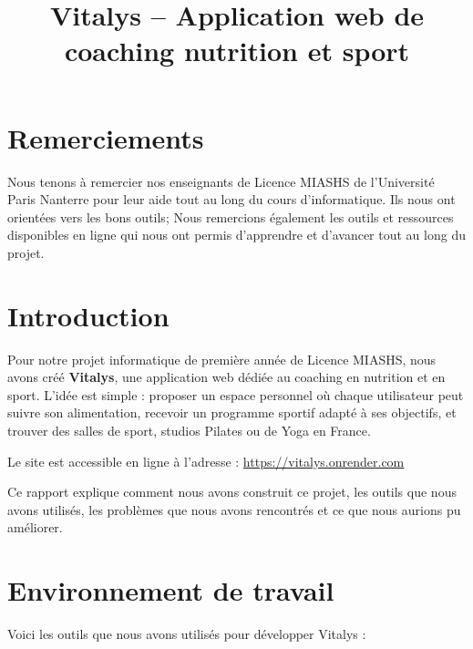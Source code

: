 \documentclass[a4paper, 12pt, twoside]{article}
\title{Vitalys -- Application web de coaching nutrition et sport}
\begin{document}
\pagedegarde



\newpage

\section*{Remerciements}
Nous tenons à remercier nos enseignants de Licence MIASHS de l'Université Paris Nanterre pour leur aide tout au long du cours d'informatique. Ils nous ont orientées vers les bons outils; Nous remercions également les outils et ressources disponibles en ligne qui nous ont permis d'apprendre et d'avancer tout au long du projet.
\newpage

\tableofcontents
\newpage

\section{Introduction}

Pour notre projet informatique de première année de Licence MIASHS, nous avons créé \textbf{Vitalys}, une application web dédiée au coaching en nutrition et en sport. L'idée est simple : proposer un espace personnel où chaque utilisateur peut suivre son alimentation, recevoir un programme sportif adapté à ses objectifs, et trouver des salles de sport, studios Pilates ou de Yoga en France.

Le site est accessible en ligne à l'adresse : \url{https://vitalys.onrender.com}

Ce rapport explique comment nous avons construit ce projet, les outils que nous avons utilisés, les problèmes que nous avons rencontrés et ce que nous aurions pu améliorer.

\section{Environnement de travail}

Voici les outils que nous avons utilisés pour développer Vitalys :
\end{document}
